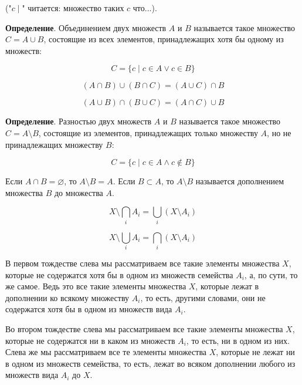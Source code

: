 \documentclass[a4paper]{book}
\begin{document}
("$c \mid$" читается: множество таких $c$ что...).

\textbf{Определение}. Объединением двух множеств $A$ и $B$ называется такое множество $C = A\cup B$, состоящие из всех элементов, принадлежащих хотя бы одному из множеств:

\begin{equation}
C = \{c \mid c\in A \vee c\in B\}
\end{equation} 

\begin{equation}
(A\cap B)\cup (B \cap C) = (A \cup C) \cap B
\end{equation}

\begin{equation}
(A\cup B)\cap (B \cup C) = (A \cap C) \cup B
\end{equation}

\textbf{Определение}. Разностью двух множеств $A$ и $B$ называется такое множество $C = A\setminus B$, состоящие из элементов, принадлежащих только множеству $A$, но не принадлежащих множеству $B$:

\begin{equation} 
C = \{c \mid c\in A \wedge c\notin B\}
\end{equation} 

Если $A\cap B = \varnothing$, то $A\setminus B = A$. Если $B \subset A$, то $A\setminus B$ называется дополнением множества $B$ до множества $A$. 

\begin{equation} \label{proof4}
X \setminus \bigcap_i A_i = \bigcup_i(X\setminus A_i)
\end{equation}

\begin{equation} \label{proof2}
X \setminus \bigcup_i A_i = \bigcap_i(X\setminus A_i)
\end{equation}

В первом тождестве слева мы рассматриваем все такие элементы множества $X$, которые не содержатся хотя бы в одном из множеств семейства $A_i$, а, по сути, то же самое. Ведь это все такие элементы множества $X$, которые лежат в дополнении ко всякому множеству $A_i$, то есть, другими словами, они не содержатся хотя бы в одном из множеств вида $A_i$. 

Во втором тождестве слева мы рассматриваем все такие элементы множества $X$, которые не содержатся ни в каком из множеств $A_i$, то есть, ни в одном из них. Слева же мы рассматриваем все те элементы множества $X$, которые не лежат ни в одном из множеств семейства, то есть, лежат во всяком дополнении любого из множеств вида $A_i$ до $X$. 
\end{document}
